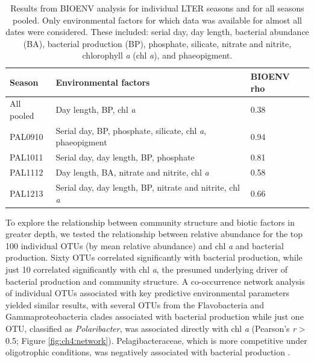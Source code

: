 \begin{table}[]
\centering
\caption[Results from BIOENV analysis, linking environmental variables to overall community similarity.]{Results from BIOENV analysis for individual LTER seasons and for all seasons pooled. Only environmental factors for which data was available for almost all dates were considered. These included: serial day, day length, bacterial abundance (BA), bacterial production (BP), phosphate, silicate, nitrate and nitrite, chlorophyll \emph{a} (chl \emph{a}), and phaeopigment.}
\label{ch4:tab:bioenv}
\small
\begin{tabular}{@{}lll@{}}
\toprule
Season     & Environmental factors                                    & BIOENV rho \\ \midrule
All pooled & Day length, BP, chl \emph{a}                             & 0.38       \\
PAL0910    & Serial day, BP, phosphate, silicate, chl \emph{a}, phaeopigment & 0.94       \\
PAL1011    & Serial day, day length, BP, phosphate                    & 0.81       \\
PAL1112    & Day length, BA, nitrate and nitrite, chl \emph{a}        & 0.58       \\
PAL1213    & Serial day, day length, BP, nitrate and nitrite, chl \emph{a}   & 0.66       \\ \bottomrule
\end{tabular}
\end{table}


To explore the relationship between community structure and biotic factors in greater depth, we tested the relationship between relative abundance for the top 100 individual OTUs (by mean relative abundance) and chl \emph{a} and bacterial production. Sixty OTUs correlated significantly with bacterial production, while just 10 correlated significantly with chl \emph{a}, the presumed underlying driver of bacterial production and community structure. A co-occurrence network analysis of individual OTUs associated with key predictive environmental parameters yielded similar results, with several OTUs from the Flavobacteria and Gammaproteobacteria clades associated with bacterial production while just one OTU, classified as \emph{Polaribacter}, was associated directly with chl \emph{a} (Pearson's \emph{r} {\textgreater} 0.5; Figure \ref{fig:ch4:network}). Pelagibacteraceae, which is more competitive under oligotrophic conditions, was negatively associated with bacterial production \citep{Tripp2013-zg}. 

